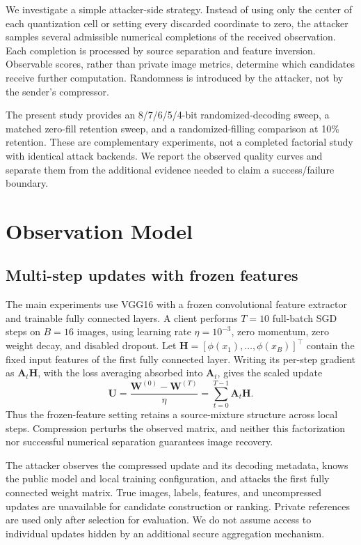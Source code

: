 \documentclass{article}
\newcommand{\U}{\mathbf{U}}
\newcommand{\HH}{\mathbf{H}}
\begin{document}
We investigate a simple attacker-side strategy. Instead of using only the
center of each quantization cell or setting every discarded coordinate to
zero, the attacker samples several admissible numerical completions of the
received observation. Each completion is processed by source separation
and feature inversion. Observable scores, rather than private image
metrics, determine which candidates receive further computation.
Randomness is introduced by the attacker, not by the sender's compressor.

The present study provides an 8/7/6/5/4-bit randomized-decoding sweep, a
matched zero-fill retention sweep, and a randomized-filling comparison at
10\% retention. These are complementary experiments, not a completed
factorial study with identical attack backends. We report the observed
quality curves and separate them from the additional evidence needed to
claim a success/failure boundary.

\section{Observation Model}
\label{sec:observation}
\subsection{Multi-step updates with frozen features}
The main experiments use VGG16 with a frozen convolutional feature
extractor and trainable fully connected layers. A client performs $T=10$
full-batch SGD steps on $B=16$ images, using learning rate $\eta=10^{-3}$,
zero momentum, zero weight decay, and disabled dropout. Let
$\HH=[\phi(x_1),\ldots,\phi(x_B)]^\top$ contain the fixed input features
of the first fully connected layer. Writing its per-step gradient as
$\mathbf{A}_t\HH$, with the loss averaging absorbed into $\mathbf{A}_t$,
gives the scaled update
\begin{equation}
  \U=\frac{\mathbf{W}^{(0)}-\mathbf{W}^{(T)}}{\eta}
      =\sum_{t=0}^{T-1}\mathbf{A}_t\HH.
  \label{eq:mixture}
\end{equation}
Thus the frozen-feature setting retains a source-mixture structure across
local steps. Compression perturbs the observed matrix, and neither this
factorization nor successful numerical separation guarantees image recovery.

The attacker observes the compressed update and its decoding metadata,
knows the public model and local training configuration, and attacks the
first fully connected weight matrix. True images, labels, features, and
uncompressed updates are unavailable for candidate construction or ranking.
Private references are used only after selection for evaluation. We do not
assume access to individual updates hidden by an additional secure
aggregation mechanism.
\end{document}
